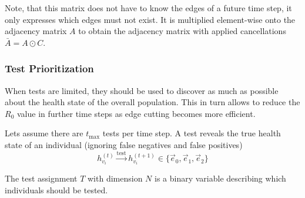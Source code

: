 Note, that this matrix does not have to know the edges of a future time step, it only expresses which edges must not exist.
It is multiplied element-wise onto the adjacency matrix $A$ to obtain the adjacency matrix with applied cancellations $\bar{A} = A \odot C$.


\subsubsection{Test Prioritization}
When tests are limited, they should be used to discover as much as possible about the health state of the overall population.
This in turn allows to reduce the $R_0$ value in further time steps as edge cutting becomes more efficient.

Lets assume there are $t_{\text{max}}$ tests per time step.
A test reveals the true health state of an individual (ignoring false negatives and false positives)
\begin{equation}
h_{{v}_i}^{(t)} \xrightarrow{\text{test}} h_{{v}_i}^{(t+1)} \in \{\vec{e}_0, \vec{e}_1, \vec{e}_2 \}
\end{equation}

The test assignment $T$ with dimension $N$ is a binary variable describing which individuals should be tested.